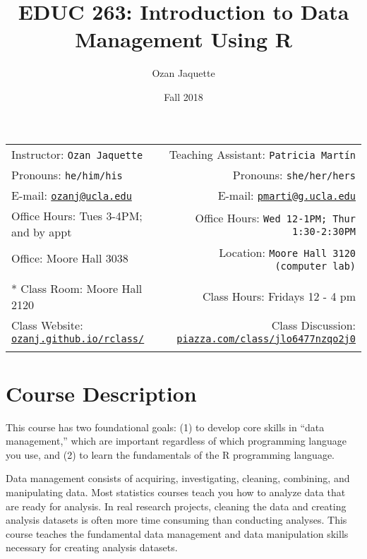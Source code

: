 \documentclass[11pt,]{article}
\title{EDUC 263: Introduction to Data Management Using R}
\author{Ozan Jaquette}
\date{Fall 2018}
\begin{document}
  

		\maketitle
		
	
		\thispagestyle{firststyle}



	\noindent \begin{tabular*}{\textwidth}{ @{\extracolsep{\fill}} lr @{\extracolsep{\fill}}}


Instructor: \texttt{Ozan Jaquette} & Teaching Assistant: \texttt{Patricia Martín} \\
Pronouns: \texttt{he/him/his} & Pronouns: \texttt{she/her/hers} \\
E-mail: \texttt{\href{mailto:ozanj@ucla.edu}{\nolinkurl{ozanj@ucla.edu}}} & E-mail: \texttt{\href{mailto:pmarti@g.ucla.edu}{\nolinkurl{pmarti@g.ucla.edu}}} \\ 
Office Hours: Tues 3-4PM; and by appt  & Office Hours: \texttt{Wed 12-1PM; Thur 1:30-2:30PM} \\
Office: Moore Hall 3038 & Location: \texttt{Moore Hall 3120 (computer lab)} \\
\\ *
Class Room: Moore Hall 2120 & Class Hours: Fridays 12 - 4 pm\\
Class Website: \href{http://ozanj.github.io/rclass/}{\tt ozanj.github.io/rclass/} & Class Discussion: \href{http://piazza.com/class/jlo6477nzqo2j0}{\tt piazza.com/class/jlo6477nzqo2j0}\\
	&  \\
	\hline
	\end{tabular*}
	
\vspace{2mm}
	


\section{Course Description}\label{course-description}

This course has two foundational goals: (1) to develop core skills in
``data management,'' which are important regardless of which programming
language you use, and (2) to learn the fundamentals of the R programming
language.

Data management consists of acquiring, investigating, cleaning,
combining, and manipulating data. Most statistics courses teach you how
to analyze data that are ready for analysis. In real research projects,
cleaning the data and creating analysis datasets is often more time
consuming than conducting analyses. This course teaches the fundamental
data management and data manipulation skills necessary for creating
analysis datasets.
\end{document}
